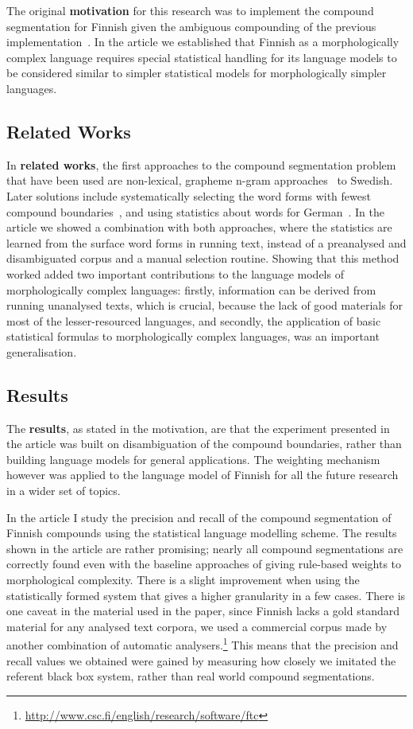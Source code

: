 \documentclass[officiallayout,final]{unihelcompling}
\begin{document}
The original \textbf{motivation} for this research was to implement the
compound segmentation for Finnish given the ambiguous compounding of the
previous implementation~\citep{pirinen2008suomen}. In the article we
established that Finnish as a morphologically complex language requires special
statistical handling for its language models to be considered similar to
simpler statistical models for morphologically simpler languages.

\subsection{Related Works}

In \textbf{related works}, the first approaches to the compound segmentation
problem that have been used are non-lexical, grapheme n-gram
approaches~\citep[referred to in]{kokkinakis2008semantically} to Swedish. Later
solutions include systematically selecting the word forms with fewest compound
boundaries~\citep{karlsson1992swetwol}, and using statistics about
words for German~\citep{schiller2006german}. In the article we showed a combination with
both approaches, where the statistics are learned from the surface word forms
in running text, instead of a preanalysed and disambiguated corpus and a
manual selection routine.  Showing that this method worked added two important
contributions to the language models of morphologically complex languages:
firstly, information can be derived from running unanalysed texts, which is
crucial, because the lack of good materials for most of the lesser-resourced
languages, and secondly, the application of basic statistical formulas to
morphologically complex languages, was an important generalisation.

\subsection{Results}

The \textbf{results}, as stated in the motivation, are that the experiment
presented in the article was built on disambiguation of the compound
boundaries, rather than building language models for general applications. The
weighting mechanism however was applied to the language model of Finnish for
all the future research in a wider set of topics.

In the article I study the precision and recall of the compound segmentation of
Finnish compounds using the statistical language modelling scheme. The results
shown in the article are rather promising; nearly all compound segmentations
are correctly found even with the baseline approaches of giving rule-based
weights to morphological complexity. There is a slight improvement when using
the statistically formed system that gives a higher granularity in a few cases.
There is one caveat in the material used in the paper, since Finnish lacks a
gold standard material for any analysed text corpora, we used a commercial
corpus made by another combination of automatic
analysers.\footnote{\url{http://www.csc.fi/english/research/software/ftc}} This
means that the precision and recall values we obtained were gained by measuring
how closely we imitated the referent black box system, rather than real world
compound segmentations.
\end{document}
